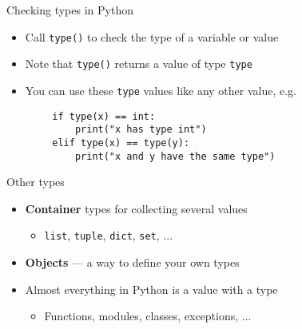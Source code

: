 \begin{frame}[fragile]{Checking types in Python}
	\begin{itemize}
		\pause\item Call \lstinline{type()} to check the type of a variable or value
		\pause\item Note that \lstinline{type()} returns a value of type \lstinline{type}
		\pause\item You can use these \lstinline{type} values like any other value, e.g.
	\end{itemize}
	\begin{lstlisting}
	    if type(x) == int:
	        print("x has type int")
	    elif type(x) == type(y):
	        print("x and y have the same type")
	\end{lstlisting}
\end{frame}

\begin{frame}{Other types}
	\begin{itemize}
		\pause\item \textbf{Container} types for collecting several values
			\begin{itemize}
				\pause\item \lstinline{list}, \lstinline{tuple}, \lstinline{dict}, \lstinline{set}, ...
			\end{itemize}
		\pause\item \textbf{Objects} --- a way to define your own types
		\pause\item Almost everything in Python is a value with a type
			\begin{itemize}
				\pause\item Functions, modules, classes, exceptions, ...
			\end{itemize}
	\end{itemize}
\end{frame}

